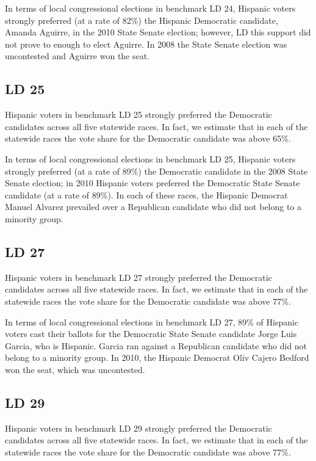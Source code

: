\documentclass[12pt]{article}
\begin{document}
In terms of local congressional elections in benchmark LD 24, Hispanic voters strongly preferred (at a rate of 82\%) the Hispanic Democratic candidate, Amanda Aguirre, in the 2010 State Senate election; however, LD this support did not prove to enough to elect Aguirre. In 2008 the State Senate election was uncontested and Aguirre won the seat.

\subsection{LD 25}

Hispanic voters in benchmark LD 25 strongly preferred the Democratic candidates across all five statewide races. In fact, we estimate that in each of the statewide races the vote share for the Democratic candidate was above 65\%. 

In terms of local congressional elections in benchmark LD 25, Hispanic voters strongly preferred (at a rate of 89\%) the Democratic candidate in the 2008 State Senate election; in 2010 Hispanic voters preferred the Democratic State Senate candidate (at a rate of 89\%). In each of these races, the Hispanic Democrat Manuel Alvarez prevailed over a Republican candidate who did not belong to a minority group.

\subsection{LD 27}

Hispanic voters in benchmark LD 27 strongly preferred the Democratic candidates across all five statewide races. In fact, we estimate that in each of the statewide races the vote share for the Democratic candidate was above 77\%. 

In terms of local congressional elections in benchmark LD 27, 89\% of Hispanic voters cast their ballots for the Democratic State Senate candidate Jorge Luis Garcia, who is Hispanic. Garcia ran against a Republican candidate who did not belong to a minority group. In 2010, the Hispanic Democrat Oliv Cajero Bedford won the seat, which was uncontested. 

\subsection{LD 29}

Hispanic voters in benchmark LD 29 strongly preferred the Democratic candidates across all five statewide races. In fact, we estimate that in each of the statewide races the vote share for the Democratic candidate was above 77\%. 
\end{document}
